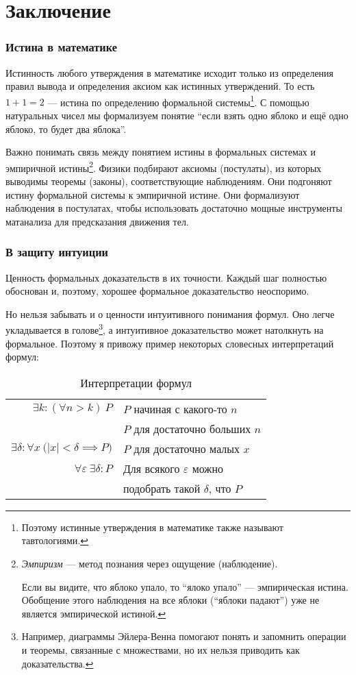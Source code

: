 \part{Заключение}

\section{Истина в математике}

Истинность любого утверждения в математике исходит только из определения правил
вывода и определения аксиом как истинных утверждений.
То есть $1+1=2$ --- истина по определению формальной системы\footnote{
	Поэтому истинные утверждения в математике также называют тавтологиями.}.
С помощью натуральных чисел мы формализуем понятие ``если взять одно яблоко
и ещё одно яблоко, то будет два яблока''.

Важно понимать связь между понятием истины в формальных системах
и эмпиричной истины\footnote{{\it Эмпиризм}
	--- метод познания через ощущение (наблюдение).

	Если вы видите, что яблоко упало, то ``ялоко упало'' --- эмпирическая истина.
	Обобщение этого наблюдения на все яблоки (``яблоки падают'') уже не является
	эмпирической истиной.}.
Физики подбирают аксиомы (постулаты),
из которых выводимы теоремы (законы), соответствующие наблюдениям.
Они подгоняют истину формальной системы к эмпиричной истине.
Они формализуют наблюдения в постулатах, чтобы использовать достаточно мощные
инструменты матанализа для предсказания движения тел.

\section{В защиту интуиции}

Ценность формальных доказательств в их точности. Каждый шаг полностью обоснован и,
поэтому, хорошее формальное доказательство неоспоримо.

Но нельзя забывать и о ценности интуитивного понимания формул.
Оно легче укладывается в голове\footnote{Например, диаграммы
	Эйлера-Венна помогают понять и запомнить операции и теоремы, связанные с
	множествами, но их нельзя приводить как доказательства.},
а интуитивное доказательство может натолкнуть на формальное.
Поэтому я привожу пример некоторых словесных интерпретаций формул:

\begin{table}
	\centering
	\begin{tabular}{r|l}
		$\exists k:(\forall n>k)~P$     & $P$ начиная с какого-то $n$       \\
		                                & $P$ для достаточно больших $n$    \\[1em]
		$\exists \delta:\forall x~
		\big(|x|<\delta\implies P\big)$ & $P$ для достаточно малых $x$      \\[1em]
		$\forall \varepsilon~
		\exists \delta:P$               & Для всякого $\varepsilon$ можно   \\
		                                & подобрать такой $\delta$, что $P$
	\end{tabular}
	\caption{Интерпретации формул}\label{table:formula_interp}
\end{table}

